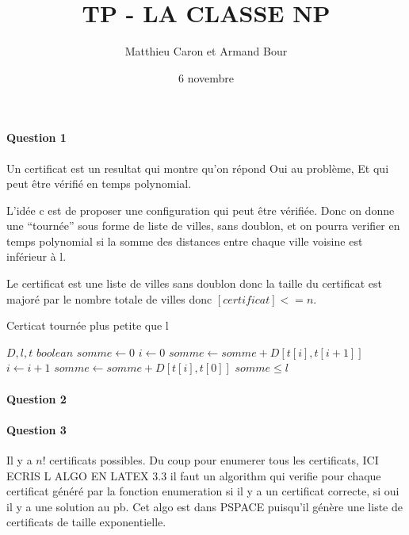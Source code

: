 \documentclass[a4paper,10pt]{article}
\title{TP - LA CLASSE NP}
\author{Matthieu Caron et Armand Bour}
\date{6 novembre}
\begin{document}
\maketitle

\paragraph{Question 1}
Un certificat est un resultat qui montre qu'on répond Oui au problème,
Et qui peut être vérifié en temps polynomial.

L'idée c est de proposer une configuration qui peut être vérifiée.
Donc on donne une ``tournée'' sous forme de liste de villes, sans doublon,
et on pourra verifier en temps polynomial si la somme des distances entre chaque ville
voisine est inférieur à l.

Le certificat est une liste de villes sans doublon donc la taille du certificat est majoré
par le nombre totale de villes donc $[certificat]<=n$.



\begin{algorithm}
\caption{Certicat tournée plus petite que l}
\begin{algorithmic}
\REQUIRE $D, l, t$
\ENSURE $boolean$
\STATE $somme \leftarrow 0$
\STATE $i \leftarrow 0$
  \STATE $somme \leftarrow somme + D[t[i],t[i+1]] $
  \STATE $i \leftarrow i + 1 $
\ENDWHILE
\STATE $somme \leftarrow somme + D[t[i],t[0]] $
\RETURN $somme \leq l $ 
\end{algorithmic}
\end{algorithm}

\paragraph{Question 2}

\paragraph{Question 3}
Il  y a $n!$ certificats possibles. Du coup pour enumerer tous les certificats, ICI ECRIS L ALGO EN LATEX
3.3 il faut un algorithm qui verifie pour chaque certificat généré par la fonction enumeration si il y a un
certificat correcte, si oui il y a une solution au pb. Cet algo est dans PSPACE puisqu'il génère une liste de certificats de taille exponentielle.
\end{document}
